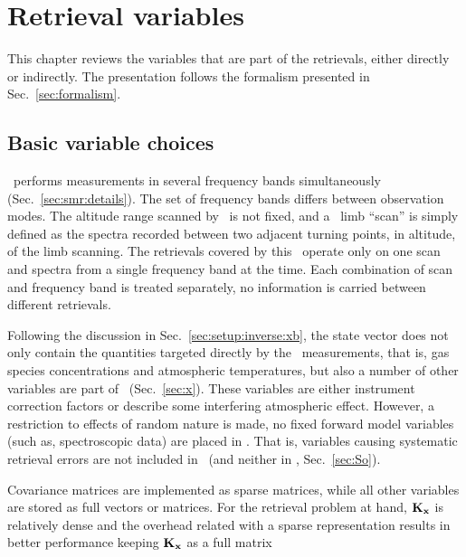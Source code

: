 \chapter{Retrieval variables}
\label{chapter:retvars}

This chapter reviews the variables that are part of the retrievals, either
directly or indirectly. The presentation follows the formalism presented in
Sec.~\ref{sec:formalism}.


\section{Basic variable choices}
\label{sec:retr:basics}
%
\smr\ performs measurements in several frequency bands simultaneously
(Sec.~\ref{sec:smr:details}). The set of frequency bands differs between
observation modes\addref. The altitude range scanned by \smr\ is not fixed, and
a \smr\ limb ``scan'' is simply defined as the spectra recorded between two
adjacent turning points, in altitude, of the limb scanning\addref. The
retrievals covered by this \ATBD\ operate only on one scan and spectra from a
single frequency band at the time. Each combination of scan and frequency band
is treated separately, no information is carried between different retrievals.

Following the discussion in Sec.~\ref{sec:setup:inverse:xb}, the state vector
does not only contain the quantities targeted directly by the \smr\
measurements, that is, gas species concentrations and atmospheric temperatures,
but also a number of other variables are part of \SttVct\ (Sec.~\ref{sec:x}).
These variables are either instrument correction factors or describe some
interfering atmospheric effect. However, a restriction to effects of random
nature is made, no fixed forward model variables (such as, spectroscopic data)
are placed in \SttVct. That is, variables causing systematic retrieval errors
are not included in \SttVct\ (and neither in \aCvrMtr{o}, Sec.~\ref{sec:So}).

Covariance matrices are implemented as sparse matrices, while all other
variables are stored as full vectors or matrices. For the retrieval problem at
hand, $\mathbf{K}_{\mathbf{x}}$ is relatively dense and the overhead related with
a sparse representation results in better performance keeping
$\mathbf{K}_{\mathbf{x}}$ as a full matrix



